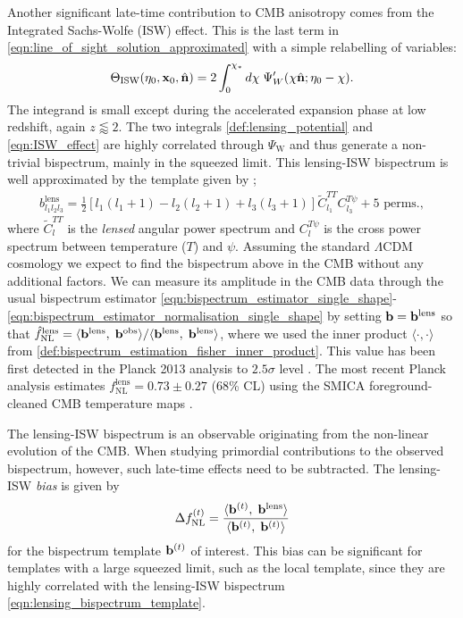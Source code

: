Another significant late-time contribution to CMB anisotropy comes from the Integrated Sachs-Wolfe (ISW) effect. This is the last term in \eqref{eqn:line_of_sight_solution_approximated} with a simple relabelling of variables:
\begin{align}
	\Theta_\text{ISW}(\eta_0,\mathbf{x}_0, \hat{\mathbf{n}}) = 2\int_0^{\chi_*} d\chi \; \Psi'_W (\chi\hat{\mathbf{n}}; \eta_0-\chi). \label{eqn:ISW_effect}
\end{align}
The integrand is small except during the accelerated expansion phase at low redshift, again $z\lessapprox2$. The two integrals \eqref{def:lensing_potential} and \eqref{eqn:ISW_effect} are highly correlated through $\Psi_\text{W}$ and thus generate a non-trivial bispectrum, mainly in the squeezed limit. This lensing-ISW bispectrum is well approximated by the template given by \cite{Lewis2011lensing};
\begin{align}
	b^\text{lens}_{l_1 l_2 l_3} = \frac{1}{2}\left[ l_1 (l_1 + 1) - l_2 (l_2 + 1) + l_3 (l_3 + 1) \right] \tilde{C}_{l_1}^{TT} C_{l_3}^{T\psi} + \text{5 perms.}, \label{eqn:lensing_bispectrum_template}
\end{align}
where $\tilde{C}^{TT}_l$ is the \textit{lensed} angular power spectrum and $C^{T\psi}_l$ is the cross power spectrum between temperature ($T$) and $\psi$. Assuming the standard $\Lambda$CDM cosmology we expect to find the bispectrum above in the CMB without any additional factors. We can measure its amplitude in the CMB data through the usual bispectrum estimator \eqref{eqn:bispectrum_estimator_single_shape}-\eqref{eqn:bispectrum_estimator_normalisation_single_shape} by setting $\mathbf{b} = \mathbf{b}^\text{lens}$ so that $\hat{f}^\text{lens}_\text{NL} = \langle \mathbf{b}^\text{lens}, \; \mathbf{b}^\text{obs} \rangle / \langle \mathbf{b}^\text{lens}, \; \mathbf{b}^\text{lens} \rangle$, where we used the inner product $\langle \cdot,\cdot \rangle$ from \eqref{def:bispectrum_estimation_fisher_inner_product}. This value has been first detected in the Planck 2013 analysis to $2.5\sigma$ level \cite{PlanckCollaboration2013ISW}. The most recent Planck analysis estimates $f^\text{lens}_\text{NL} = 0.73 \pm 0.27$ (68\% CL) using the SMICA foreground-cleaned CMB temperature maps \cite{PlanckCollaboration2018}.

The lensing-ISW bispectrum is an observable originating from the non-linear evolution of the CMB. When studying primordial contributions to the observed bispectrum, however, such late-time effects need to be subtracted. The lensing-ISW \textit{bias} is given by
\begin{align}
	\Delta f_\text{NL}^{(t)} = \frac{ \langle \mathbf{b}^{(t)}, \; \mathbf{b}^\text{lens} \rangle }{ \langle \mathbf{b}^{(t)}, \; \mathbf{b}^{(t)} \rangle} \label{eqn:lensing_ISW_bias}
\end{align}
for the bispectrum template $\mathbf{b}^{(t)}$ of interest. This bias can be significant for templates with a large squeezed limit, such as the local template, since they are highly correlated with the lensing-ISW bispectrum \eqref{eqn:lensing_bispectrum_template}.


